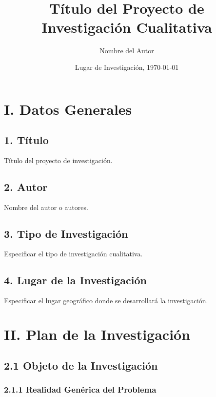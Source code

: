 \documentclass[12pt]{../componentes/uns}
\title{Título del Proyecto de Investigación Cualitativa}
\author{Nombre del Autor}
\date{Lugar de Investigación, \today}
\begin{document}
\maketitle

\newpage
\tableofcontents
\newpage

\section*{I. Datos Generales}

\subsection*{1. Título}
Título del proyecto de investigación.

\subsection*{2. Autor}
Nombre del autor o autores.

\subsection*{3. Tipo de Investigación}
Especificar el tipo de investigación cualitativa.

\subsection*{4. Lugar de la Investigación}
Especificar el lugar geográfico donde se desarrollará la investigación.

\section*{II. Plan de la Investigación}

\subsection*{2.1 Objeto de la Investigación}
\subsubsection*{2.1.1 Realidad Genérica del Problema}
\lipsum[1] %
\end{document}
